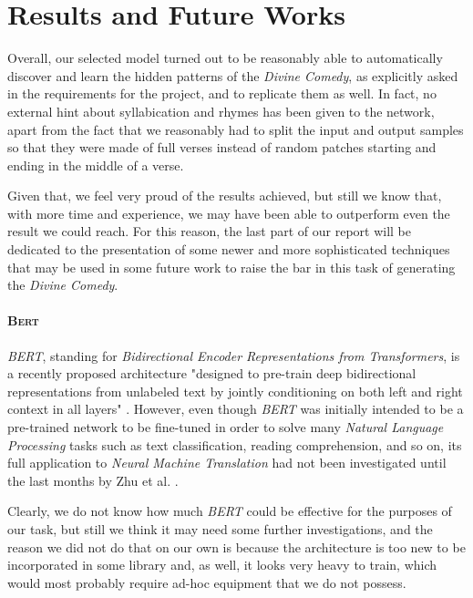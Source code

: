 \chapter{Results and Future Works}

Overall, our selected model turned out to be reasonably able to automatically discover and learn the hidden patterns of the \textit{Divine Comedy}, as explicitly asked in the requirements for the project, and to replicate them as well.
In fact, no external hint about syllabication and rhymes has been given to the network, apart from the fact that we reasonably had to split the input and output samples so that they were made of full verses instead of random patches starting and ending in the middle of a verse.

Given that, we feel very proud of the results achieved, but still we know that, with more time and experience, we may have been able to outperform even the result we could reach.
For this reason, the last part of our report will be dedicated to the presentation of some newer and more sophisticated techniques that may be used in some future work to raise the bar in this task of generating the \textit{Divine Comedy}.

\subsubsection{\textsc{Bert}}

\textit{BERT}, standing for \textit{Bidirectional Encoder Representations from Transformers}, is a recently proposed architecture "designed to pre-train deep bidirectional representations from unlabeled text by jointly conditioning on both left and right context in all layers" \cite{devlin2018bert}.
However, even though \textit{BERT} was initially intended to be a pre-trained network to be fine-tuned in order to solve many \textit{Natural Language Processing} tasks such as text classification, reading comprehension, and so on, its full application to \textit{Neural Machine Translation} had not been investigated until the last months by Zhu et al. \cite{zhu2020incorporating}.

Clearly, we do not know how much \textit{BERT} could be effective for the purposes of our task, but still we think it may need some further investigations, and the reason we did not do that on our own is because the architecture is too new to be incorporated in some library and, as well, it looks very heavy to train, which would most probably require ad-hoc equipment that we do not possess.

